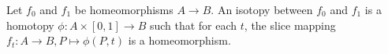 Let $f_0$ and $f_1$ be homeomorphisms $A \rightarrow B$. An isotopy between $f_0$ and $f_1$ is a homotopy $\phi: A \times [0, 1] \rightarrow B$ such that for each $t$, the slice mapping $f_t: A \rightarrow B, P \mapsto \phi(P, t)$ is a homeomorphism.
